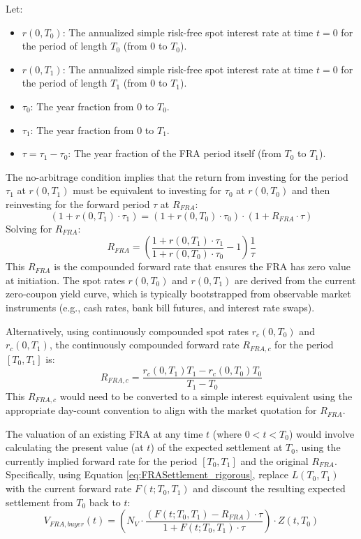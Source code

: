 \documentclass[11pt, a4paper, british]{article}
\begin{document}
Let:
\begin{itemize}
 \item $r(0, T_0)$: The annualized simple risk-free spot interest rate at time $t=0$ for the period of length $T_0$ (from $0$ to $T_0$).
 \item $r(0, T_1)$: The annualized simple risk-free spot interest rate at time $t=0$ for the period of length $T_1$ (from $0$ to $T_1$).
 \item $\tau_0$: The year fraction from $0$ to $T_0$.
 \item $\tau_1$: The year fraction from $0$ to $T_1$.
 \item $\tau = \tau_1 - \tau_0$: The year fraction of the FRA period itself (from $T_0$ to $T_1$).
\end{itemize}
The no-arbitrage condition implies that the return from investing for the period $\tau_1$ at $r(0, T_1)$ must be equivalent to investing for $\tau_0$ at $r(0, T_0)$ and then reinvesting for the forward period $\tau$ at $R_{FRA}$:
\begin{equation}
 (1 + r(0, T_1) \cdot \tau_1) = (1 + r(0, T_0) \cdot \tau_0) \cdot (1 + R_{FRA} \cdot \tau)
\end{equation}
Solving for $R_{FRA}$:
\begin{equation}
 R_{FRA} = \left( \frac{1 + r(0, T_1) \cdot \tau_1}{1 + r(0, T_0) \cdot \tau_0} - 1 \right) \frac{1}{\tau}
 \label{eq:fra_rate_simple_rigorous}
\end{equation}
This $R_{FRA}$ is the compounded forward rate that ensures the FRA has zero value at initiation. The spot rates $r(0, T_0)$ and $r(0, T_1)$ are derived from the current zero-coupon yield curve, which is typically bootstrapped from observable market instruments (e.g., cash rates, bank bill futures, and interest rate swaps).

Alternatively, using continuously compounded spot rates $r_c(0, T_0)$ and $r_c(0, T_1)$, the continuously compounded forward rate $R_{FRA,c}$ for the period $[T_0, T_1]$ is:
\begin{equation}
 R_{FRA,c} = \frac{r_c(0, T_1)T_1 - r_c(0, T_0)T_0}{T_1 - T_0}
 \label{eq:fra_rate_continuous_rigorous}
\end{equation}
This $R_{FRA,c}$ would need to be converted to a simple interest equivalent using the appropriate day-count convention to align with the market quotation for $R_{FRA}$.

The valuation of an existing FRA at any time $t$ (where $0 < t < T_0$) would involve calculating the present value (at $t$) of the expected settlement at $T_0$, using the currently implied forward rate for the period $[T_0, T_1]$ and the original $R_{FRA}$. Specifically, using Equation \ref{eq:FRASettlement_rigorous}, replace $L(T_0,T_1)$ with the current forward rate $F(t; T_0, T_1)$ and discount the resulting expected settlement from $T_0$ back to $t$:
\begin{equation}
 V_{FRA, buyer}(t) = \left( N_V \cdot \frac{(F(t; T_0, T_1) - R_{FRA}) \cdot \tau}{1 + F(t; T_0, T_1) \cdot \tau} \right) \cdot Z(t, T_0)
 \label{eq:fra_valuation_t_rigorous}
\end{equation}
\end{document}
